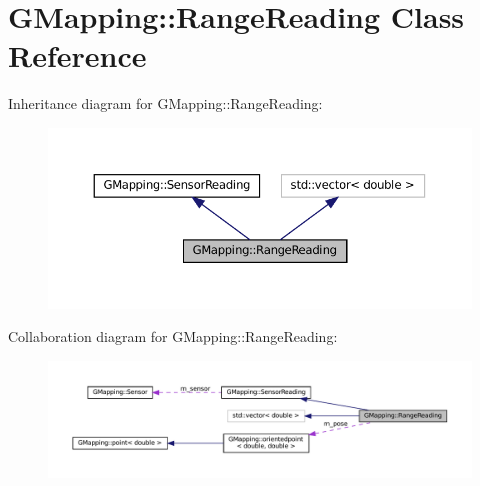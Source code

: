 \hypertarget{classGMapping_1_1RangeReading}{}\section{G\+Mapping\+:\+:Range\+Reading Class Reference}
\label{classGMapping_1_1RangeReading}


Inheritance diagram for G\+Mapping\+:\+:Range\+Reading\+:
\nopagebreak
\begin{figure}[H]
\begin{center}
\leavevmode
\includegraphics[width=350pt]{classGMapping_1_1RangeReading__inherit__graph}
\end{center}
\end{figure}


Collaboration diagram for G\+Mapping\+:\+:Range\+Reading\+:
\nopagebreak
\begin{figure}[H]
\begin{center}
\leavevmode
\includegraphics[width=350pt]{classGMapping_1_1RangeReading__coll__graph}
\end{center}
\end{figure}
